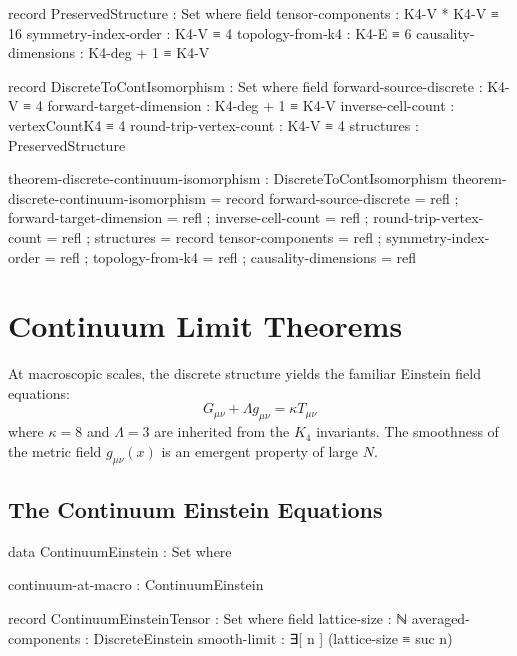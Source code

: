 \documentclass[11pt,a4paper]{book}
\begin{document}
\begin{code}
record PreservedStructure : Set where
  field
    tensor-components : K4-V * K4-V ≡ 16
    symmetry-index-order : K4-V ≡ 4
    topology-from-k4 : K4-E ≡ 6
    causality-dimensions : K4-deg + 1 ≡ K4-V

record DiscreteToContIsomorphism : Set where
  field
    forward-source-discrete : K4-V ≡ 4
    forward-target-dimension : K4-deg + 1 ≡ K4-V
    inverse-cell-count : vertexCountK4 ≡ 4
    round-trip-vertex-count : K4-V ≡ 4
    structures : PreservedStructure

theorem-discrete-continuum-isomorphism : DiscreteToContIsomorphism
theorem-discrete-continuum-isomorphism = record
  { forward-source-discrete = refl
  ; forward-target-dimension = refl
  ; inverse-cell-count = refl
  ; round-trip-vertex-count = refl
  ; structures = record
      { tensor-components = refl
      ; symmetry-index-order = refl
      ; topology-from-k4 = refl
      ; causality-dimensions = refl
      }
  }
\end{code}

\chapter{Continuum Limit Theorems}
\label{chap:continuum-physics}

At macroscopic scales, the discrete structure yields the familiar Einstein field equations:
\[
G_{\mu\nu} + \Lambda g_{\mu\nu} = \kappa T_{\mu\nu}
\]
where $\kappa = 8$ and $\Lambda = 3$ are inherited from the $K_4$ invariants. The smoothness 
of the metric field $g_{\mu\nu}(x)$ is an emergent property of large $N$.

\section{The Continuum Einstein Equations}

\begin{code}
data ContinuumEinstein : Set where

  continuum-at-macro : ContinuumEinstein

record ContinuumEinsteinTensor : Set where
  field
    lattice-size : ℕ
    averaged-components : DiscreteEinstein
    smooth-limit : ∃[ n ] (lattice-size ≡ suc n)

\end{code}
\end{document}

